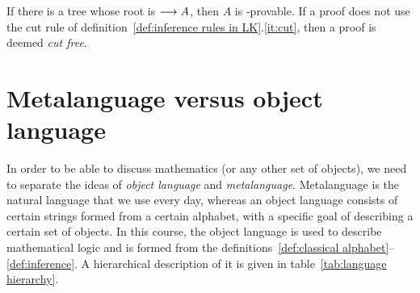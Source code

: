 \documentclass[11pt,a4paper]{article}
\begin{document}
If there is a tree whose root is \(\longrightarrow A\), then \(A\) is \LK-provable.
If a proof does not use the cut rule of definition~\ref{def:inference rules in LK}.\ref{it:cut},
then a proof is deemed \emph{cut free}.

\section{Metalanguage versus object language}

In order to be able to discuss mathematics (or any other set of objects), we need to separate the ideas of
\emph{object language} and \emph{metalanguage}. Metalanguage is the natural language
that we use every day, whereas an object language consists of certain strings formed from
a certain alphabet, with a specific goal of describing a certain set of objects.
In this course, the object language is used to describe mathematical logic and
is formed from the definitions~\ref{def:classical alphabet}--\ref{def:inference}.
A hierarchical description of it is given in table~\ref{tab:language hierarchy}.
\end{document}
